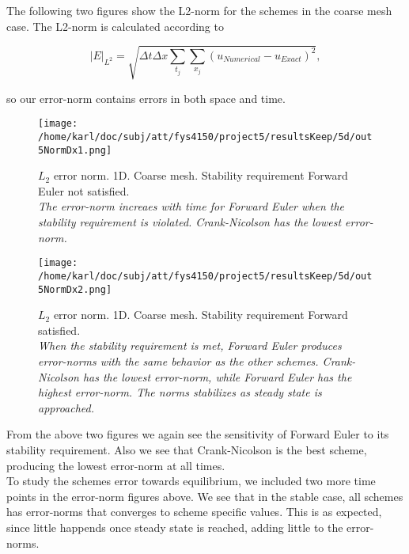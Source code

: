 \documentclass{article}
\begin{document}
The following two figures show the L2-norm for the schemes in the coarse mesh case. The L2-norm is calculated according to

\begin{equation}\label{eq:norm1d}
	|E|_{L^2} = \sqrt{\Delta t \Delta x \sum_{t_j} \sum_{x_j} (u_{Numerical} - u_{Exact})^2},
\end{equation}

so our error-norm contains errors in both space and time.

\begin{minipage}{.45\textwidth} 
	\begin{figure}[H]
		\centering
		\texttt{[image: /home/karl/doc/subj/att/fys4150/project5/resultsKeep/5d/out5NormDx1.png]}
		\caption{$L_2$ error norm. 1D. Coarse mesh. Stability requirement Forward Euler not satisfied.\\ \textit{The error-norm increaes with time for Forward Euler when the stability requirement is violated. Crank-Nicolson has the lowest error-norm.}}
		\label{fig:l21}
	\end{figure}
\end{minipage}\hfill
\begin{minipage}{.45\textwidth} 
	\begin{figure}[H]
		\centering
		\texttt{[image: /home/karl/doc/subj/att/fys4150/project5/resultsKeep/5d/out5NormDx2.png]}
		\caption{$L_2$ error norm. 1D. Coarse mesh. Stability requirement Forward satisfied.\\ \textit{When the stability requirement is met, Forward Euler produces error-norms with the same behavior as the other schemes. Crank-Nicolson has the lowest error-norm, while Forward Euler has the highest error-norm. The norms stabilizes as steady state is approached.}}
		\label{fig:l22}
	\end{figure}
\end{minipage}\hfill
\vspace{2ex}

From the above two figures we again see the sensitivity of Forward Euler to its stability requirement. Also we see that Crank-Nicolson is the best scheme, producing the lowest error-norm at all times. \\

To study the schemes error towards equilibrium, we included two more time points in the error-norm figures above. We see that in the stable case, all schemes has error-norms that converges to scheme specific values. This is as expected, since little happends once steady state is reached, adding little to the error-norms.\\ 
\end{document}
